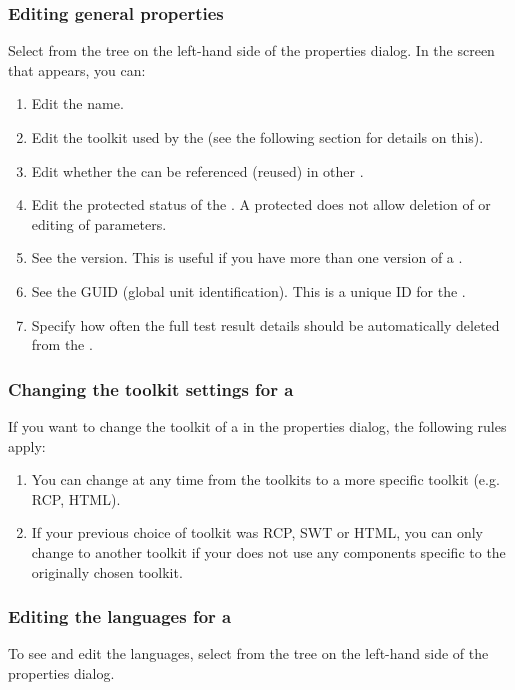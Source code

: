 \subsubsection{Editing general \gdproject{} properties}
\label{ProjPropertiesGeneral}
Select  from the tree on the left-hand side of the \gdproject{} properties dialog. In the screen that appears, you can:
\begin{enumerate}
\item Edit the \gdproject{} name. 
\item Edit the toolkit used by the \gdproject{} (see the following section  for details on this). 
\item Edit whether the \gdproject{} can be referenced (reused) in other \gdprojects{}.
\item Edit the protected status of the \gdproject{}. A protected \gdproject{} does not allow deletion of \gdcases{} or editing of parameters. 
\item See the \gdproject{} version. This is useful if you have more than one version of a \gdproject{}. 
\item See the GUID (global unit identification). This is a unique ID for the \gdproject{}. 
\item Specify how often the full test result details  should be automatically deleted from the \gddb{}.
\end{enumerate}

\subsubsection{Changing the toolkit settings for a \gdproject{}}
\label{ProjPropertiesChangingToolkit}
If you want to change the toolkit of a \gdproject{} in the \gdproject{} properties dialog, the following rules apply:
\begin{enumerate}
\item You can change at any time from the  toolkits to a more specific toolkit (e.g. RCP, HTML). 
\item If your previous choice of toolkit was RCP, SWT or HTML, you can only change to another toolkit if your \gdproject{} does not use any components specific to the originally chosen toolkit. 
\end{enumerate}

\subsubsection{Editing the languages for a \gdproject}
\label{ProjPropertiesLanguage}
To see and edit the \gdproject{} languages, select  from the tree on the left-hand side of the \gdproject{} properties dialog. 

